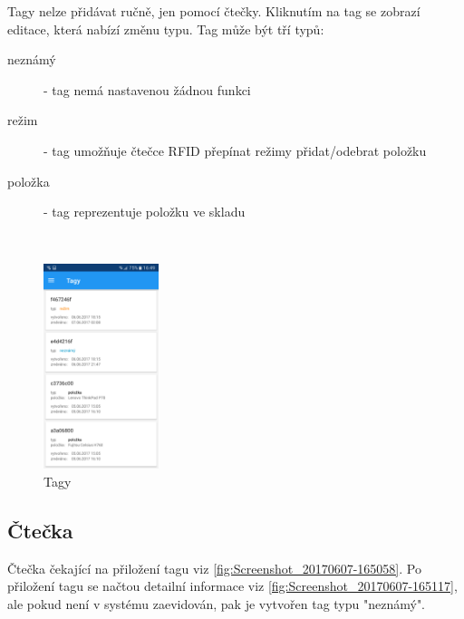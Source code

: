 \documentclass[czech,BP]{thesiskiv}
\begin{document}
Tagy nelze přidávat ručně, jen pomocí čtečky. Kliknutím na tag se zobrazí editace, která nabízí změnu typu. Tag může být tří typů:
\begin{description}
\item [neznámý] - tag nemá nastavenou žádnou funkci
\item [režim] - tag umožňuje čtečce RFID přepínat režimy přidat/odebrat položku
\item [položka] - tag reprezentuje položku ve skladu 
\end{description}
\ \\

\begin{figure}[h]
	\centering
	\includegraphics[width=0.3\textwidth]{../images/client_android/Screenshot_20170607-164958.png}	
	\caption{Tagy}
	\label{fig:Screenshot_20170607-164958}
\end{figure}
\subsection{Čtečka}
Čtečka čekající na přiložení tagu viz \ref{fig:Screenshot_20170607-165058}.
Po přiložení tagu se načtou detailní informace viz \ref{fig:Screenshot_20170607-165117}, ale pokud není v systému zaevidován, pak je vytvořen tag typu "neznámý".
\end{document}
